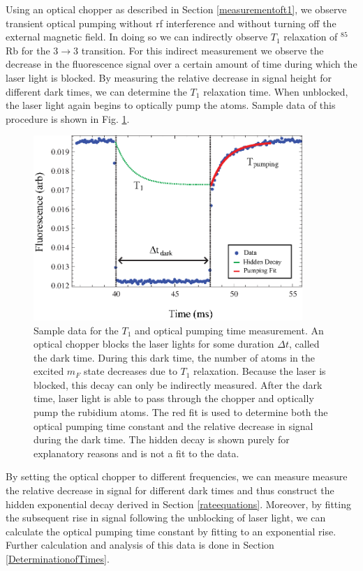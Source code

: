 Using an optical chopper as described in Section \ref{measurementoft1}, we observe transient optical pumping without rf interference and without turning off the external magnetic field.  In doing so we can indirectly observe $T_1$ relaxation of $^{85}$Rb for the $3 \rightarrow 3$ transition.  For this indirect measurement we observe the decrease in the fluorescence signal over a certain amount of time during which the laser light is blocked.  By measuring the relative decrease in signal height for different dark times, we can determine the $T_1$ relaxation time. When unblocked, the laser light again begins to optically pump the atoms.  Sample data of this procedure is shown in Fig. \ref{fig:chop}.
\begin{figure}[htbp]
\begin{center}
\includegraphics[height=70mm]{./figures/raw_chop.eps}
\caption{\small{Sample data for the $T_1$ and optical pumping time measurement.  An optical chopper blocks the laser lights for some duration $\Delta t$, called the dark time.  During this dark time, the number of atoms in the excited $m_F$ state decreases due to $T_1$ relaxation.  Because the laser is blocked, this decay can only be indirectly measured.  After the dark time, laser light is able to pass through the chopper and optically pump the rubidium atoms.  The red fit is used to determine both the optical pumping time constant and the relative decrease in signal during the dark time. The hidden decay is shown purely for explanatory reasons and is not a fit to the data.}}
\label{fig:chop}
\end{center}
\end{figure}
By setting the optical chopper to different frequencies, we can measure measure the relative decrease in signal for different dark times and thus construct the hidden exponential decay derived in Section \ref{rateequations}.  Moreover, by fitting the subsequent rise in signal following the unblocking of laser light, we can calculate the optical pumping time constant by fitting to an exponential rise.  Further calculation and analysis of this data is done in Section \ref{DeterminationofTimes}.

